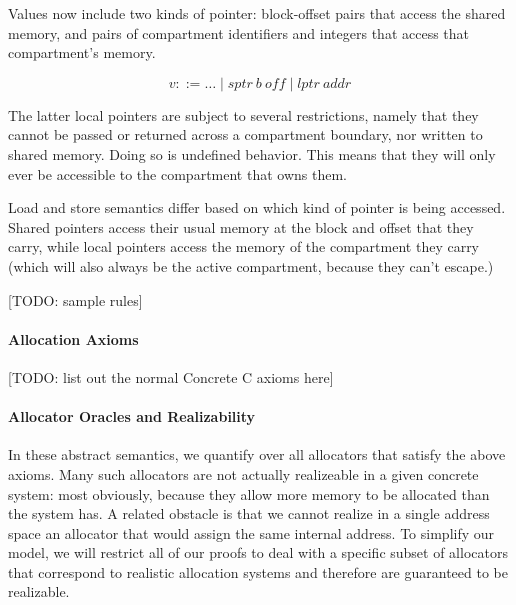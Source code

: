 \documentclass{article}
\begin{document}
Values now include two kinds of pointer: block-offset pairs that access the shared memory,
and pairs of compartment identifiers and integers that access that compartment's memory.

\[v ::= \dots \mid \mathit{sptr} ~ b ~ \mathit{off} \mid \mathit{lptr} ~ \mathit{addr}\]

The latter local pointers are subject to several restrictions, namely that they cannot be
passed or returned across a compartment boundary, nor written to shared memory. Doing so
is undefined behavior. This means that they will only ever be accessible to the compartment
that owns them. 

Load and store semantics differ based on which kind of pointer is being accessed.
Shared pointers access their usual memory at the block and offset that they carry,
while local pointers access the memory of the compartment they carry (which will also
always be the active compartment, because they can't escape.)

[TODO: sample rules]

\paragraph{Allocation Axioms}

[TODO: list out the normal Concrete C axioms here]

\paragraph{Allocator Oracles and Realizability}


In these abstract semantics, we quantify over all allocators that satisfy the above axioms.
Many such allocators are not actually realizeable in a given concrete system: most obviously,
because they allow more memory to be allocated than the system has. A related obstacle is that
we cannot realize in a single address space an allocator that would assign the same internal
address. To simplify our model, we will restrict all of our proofs to deal with a specific subset of
allocators that correspond to realistic allocation systems and therefore are guaranteed to be
realizable.
\end{document}
